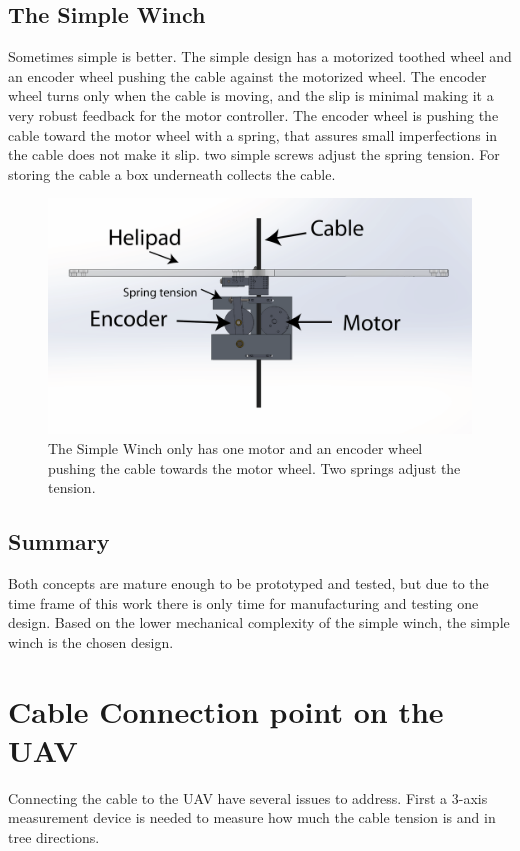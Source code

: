 
\subsection{The Simple Winch}
Sometimes simple is better. The simple design has a motorized toothed wheel and an encoder wheel pushing the cable against the motorized wheel. The encoder wheel turns only when the cable is moving, and the slip is minimal making it a very robust feedback for the motor controller. The encoder wheel is pushing the cable toward the motor wheel with a spring, that assures small imperfections in the cable does not make it slip. two simple screws adjust the spring tension. For storing the cable a box underneath collects the cable.

\begin{figure}[H]
\centering
\includegraphics[scale=0.75]{graphics/cad/winch.png}
\caption{The Simple Winch only has one motor and an encoder wheel pushing the cable towards the motor wheel. Two springs adjust the tension.}
\label{fig:winch}
\end{figure}

\subsection{Summary}
Both concepts are mature enough to be prototyped and tested, but due to the time frame of this work there is only time for manufacturing and testing one design. Based on the lower mechanical complexity of the simple winch, the simple winch is the chosen design.    


\section{Cable Connection point on the UAV}
Connecting the cable to the UAV have several issues to address. First a 3-axis measurement device is needed to measure how much the cable tension is and in tree directions. 

